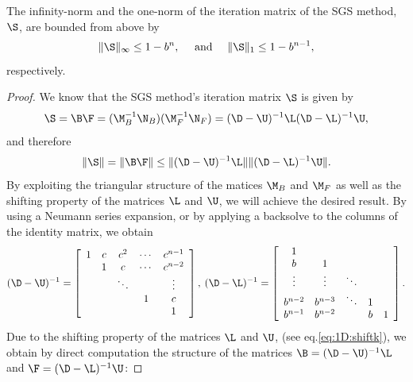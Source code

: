 \begin{lemma}\label{lem:1D:matSnorms}
The infinity-norm and the one-norm of the iteration matrix of the SGS method,
$\S$, are bounded from above by
\begin{equation*}
\|\S\|_{\infty} \leq 1-b^n,
\quad
\text{ and }
\quad
\|\S\|_{1} \leq 1-b^{n-1},
\end{equation*}
respectively.
\end{lemma}
\begin{proof}
We know that the SGS method's iteration matrix $\S$ is given by
\[\S=\B\F=(\M_{B}^{-1}\N_{B})(\M_{F}^{-1}\N_{F})=(\D-\U)^{-1}\L(\D-\L)^{-1}\U,\]
and therefore
\[\|\S\|=\|\B\F\|\leq\|(\D-\U)^{-1}\L\|\|(\D-\L)^{-1}\U\|.\]
By exploiting the triangular structure of the matices $\M_B$ and $\M_F$ as well
as the shifting property of the matrices $\L$ and $\U$, we will achieve the
desired result.
%
By using a Neumann series expansion, or by applying a backsolve to the columns
of the identity matrix, we obtain
\[(\D-\U)^{-1}=
\left[
\begin{array}{ccccc}
1   & c   & c^2     & \cdots  & c^{n-1}\\
    & 1   & c       & \cdots  & c^{n-2}\\
    &     & \ddots  &         & \vdots\\
    &     &         &   1     & c\\
    &     &         &         & 1\\
\end{array}
\right],
\:
(\D-\L)^{-1}=
\left[
\begin{array}{ccccc}
 1       &         &         &          & \\
 b       & 1       &         &          & \\
 \vdots  & \vdots  & \ddots  &          & \\
 b^{n-2} & b^{n-3} & \ddots  & 1        & \\
 b^{n-1} & b^{n-2} &         & b        & 1\\
\end{array}
\right].
\]
Due to the shifting property of the matrices $\L$ and $\U$, (see
eq.\eqref{eq:1D:shiftk}), we obtain by direct computation the structure of the
matrices $\B = (\D-\U)^{-1}\L$ and $\F = (\D-\L)^{-1}\U$:


\end{proof}
